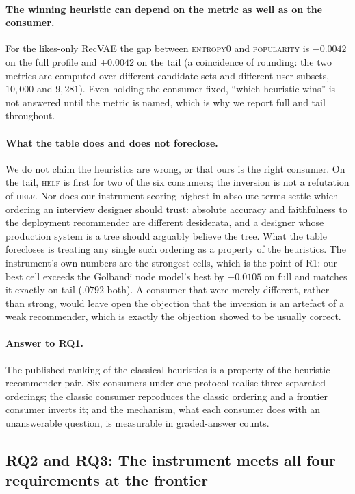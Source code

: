 \documentclass[acmsmall,review,anonymous]{acmart}
\begin{document}
\paragraph{The winning heuristic can depend on the metric as well as on the consumer.} For the likes-only RecVAE the gap between \textsc{entropy0} and \textsc{popularity} is $-0.0042$ on the full profile and $+0.0042$ on the tail (a coincidence of rounding: the two metrics are computed over different candidate sets and different user subsets, $10{,}000$ and $9{,}281$). Even holding the consumer fixed, ``which heuristic wins'' is not answered until the metric is named, which is why we report full and tail throughout.

\paragraph{What the table does and does not foreclose.} We do not claim the heuristics are wrong, or that ours is the right consumer. On the tail, \textsc{helf} is first for two of the six consumers; the inversion is not a refutation of \textsc{helf}. Nor does our instrument scoring highest in absolute terms settle which ordering an interview designer should trust: absolute accuracy and faithfulness to the deployment recommender are different desiderata, and a designer whose production system is a tree should arguably believe the tree. What the table forecloses is treating any single such ordering as a property of the heuristics. The instrument's own numbers are the strongest cells, which is the point of R1: our best cell exceeds the Golbandi node model's best by $+0.0105$ on full and matches it exactly on tail ($.0792$ both). A consumer that were merely different, rather than strong, would leave open the objection that the inversion is an artefact of a weak recommender, which is exactly the objection \citet{dacrema2019progress} showed to be usually correct.

\paragraph{Answer to RQ1.} The published ranking of the classical heuristics is a property of the heuristic--recommender pair. Six consumers under one protocol realise three separated orderings; the classic consumer reproduces the classic ordering and a frontier consumer inverts it; and the mechanism, what each consumer does with an unanswerable question, is measurable in graded-answer counts.

\subsection{RQ2 and RQ3: The instrument meets all four requirements at the frontier}\label{sec:res:battery}
\end{document}
